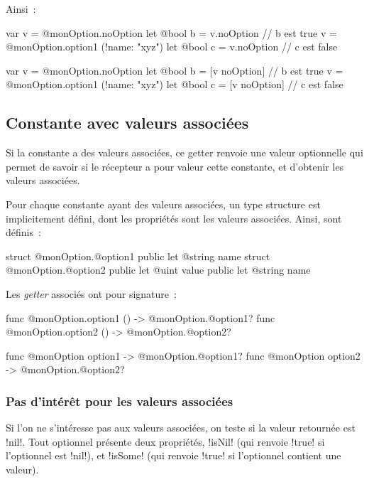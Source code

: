 Ainsi~:

\begin{galgas4}
var v = @monOption.noOption
let @bool b = v.noOption // b est true
v = @monOption.option1 (!name: "xyz")
let @bool c = v.noOption // c est false
\end{galgas4}
\begin{galgas3}
var v = @monOption.noOption
let @bool b = [v noOption] // b est true
v = @monOption.option1 (!name: "xyz")
let @bool c = [v noOption] // c est false
\end{galgas3}

\subsection{Constante avec valeurs associées}

Si la constante a des valeurs associées, ce getter renvoie une valeur optionnelle qui permet de savoir si le récepteur a pour valeur cette constante, et d'obtenir les valeurs associées.

Pour chaque constante ayant des valeurs associées, un type structure est implicitement défini, dont les propriétés sont les valeurs associées. Ainsi, sont définis~:
\begin{galgas4}
struct @monOption.@option1 {
  public let @string name
}
struct @monOption.@option2 {
  public let @uint value
  public let @string name
}
\end{galgas4}

Les \emph{getter} associés ont pour signature~:
\begin{galgas4}
func @monOption.option1 () -> @monOption.@option1?
func @monOption.option2 () -> @monOption.@option2?
\end{galgas4}
\begin{galgas3}
func @monOption option1 -> @monOption.@option1?
func @monOption option2 -> @monOption.@option2?
\end{galgas3}

\subsubsection{Pas d'intérêt pour les valeurs associées}

Si l'on ne s'intéresse pas aux valeurs associées, on teste si la valeur retournée est \ggsq!nil!. Tout optionnel présente deux propriétés, \ggsq!isNil! (qui renvoie \ggsq!true! si l'optionnel est \ggsq!nil!), et \ggsq!isSome! (qui renvoie \ggsq!true! si l'optionnel contient une valeur).

